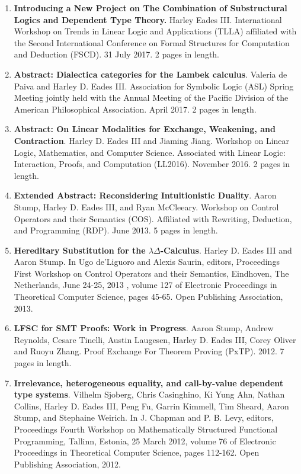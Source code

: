 \documentclass[11pt]{article}
\begin{document}
\begin{enumerate}
  \item[] \textbf{Introducing a New Project on The Combination of
    Substructural Logics and Dependent Type Theory.} Harley Eades III.
    International Workshop on Trends in Linear Logic and Applications
    (TLLA) affiliated with the Second International Conference on
    Formal Structures for Computation and Deduction (FSCD). 31 July
    2017. 2 pages in length.
    
  \item[] \textbf{Abstract: Dialectica categories for the Lambek
    calculus}.  Valeria de Paiva and Harley D. Eades III. Association for
    Symbolic Logic (ASL) Spring Meeting jointly held with the Annual
    Meeting of the Pacific Division of the American Philosophical
    Association.  April 2017.  2 pages in length.
    
  \item[] \textbf{Abstract: On Linear Modalities for Exchange,
    Weakening, and Contraction}.  Harley D. Eades III and Jiaming Jiang.
    Workshop on Linear Logic, Mathematics, and Computer
    Science. Associated with Linear Logic: Interaction, Proofs, and
    Computation (LL2016).  November 2016. 2 pages in length.

  \item[] \textbf{Extended Abstract: Reconsidering Intuitionistic
    Duality}.  Aaron Stump, Harley D. Eades III, and Ryan
    McCleeary. Workshop on Control Operators and their Semantics
    (COS).  Affiliated with Rewriting, Deduction, and Programming
    (RDP). June 2013.  5 pages in length.

  \item[] \textbf{Hereditary Substitution for the
    $\lambda\Delta$-Calculus}.  Harley D. Eades III and Aaron Stump.
    In Ugo de'Liguoro and Alexis Saurin, editors, Proceedings First
    Workshop on Control Operators and their Semantics, Eindhoven, The
    Netherlands, June 24-25, 2013 , volume 127 of Electronic
    Proceedings in Theoretical Computer Science, pages 45-65. Open
    Publishing Association, 2013.

  \item[] \textbf{LFSC for SMT Proofs: Work in Progress}.  Aaron
    Stump, Andrew Reynolds, Cesare Tinelli, Austin Laugesen, Harley
    D. Eades III, Corey Oliver and Ruoyu Zhang.  Proof Exchange For
    Theorem Proving (PxTP). 2012. 7 pages in length.
    
  \item[] \textbf{Irrelevance, heterogeneous equality, and call-by-value
    dependent type systems}.  Vilhelm Sjoberg, Chris Casinghino, Ki
    Yung Ahn, Nathan Collins, Harley D. Eades III, Peng Fu, Garrin
    Kimmell, Tim Sheard, Aaron Stump, and Stephaine Weirich.  In
    J. Chapman and P. B. Levy, editors, Proceedings Fourth Workshop on
    Mathematically Structured Functional Programming, Tallinn,
    Estonia, 25 March 2012, volume 76 of Electronic Proceedings in
    Theoretical Computer Science, pages 112-162. Open Publishing
    Association, 2012.
    

\end{enumerate}
\end{document}
